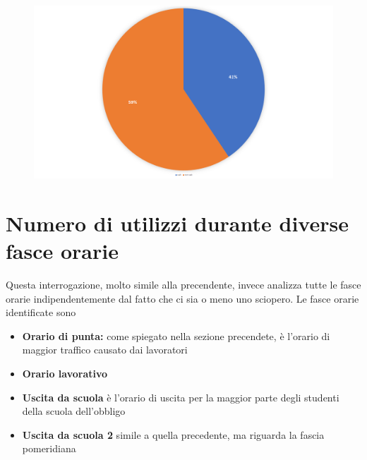 \begin{figure}[H]                                                                                                                                                            
\centering                                                                                                                                                                   
\includegraphics[width=\textwidth]{images/result5}                                                                                                                                   
\label{fig:result5}                                                                                                                                                           
\end{figure}


\section{Numero di utilizzi durante diverse fasce orarie}
Questa interrogazione, molto simile alla precendente, invece analizza
tutte le fasce orarie indipendentemente dal fatto che ci sia o meno uno sciopero.
Le fasce orarie identificate sono
\begin{itemize}
	\item{\textbf{Orario di punta:} come spiegato nella sezione precendete, è l'orario di maggior traffico causato dai lavoratori}
	\item{\textbf{Orario lavorativo}}
	\item{\textbf{Uscita da scuola} è l'orario di uscita per la maggior parte degli studenti della scuola dell'obbligo}
	\item{\textbf{Uscita da scuola 2} simile a quella precedente, ma riguarda la fascia pomeridiana}
\end{itemize}

